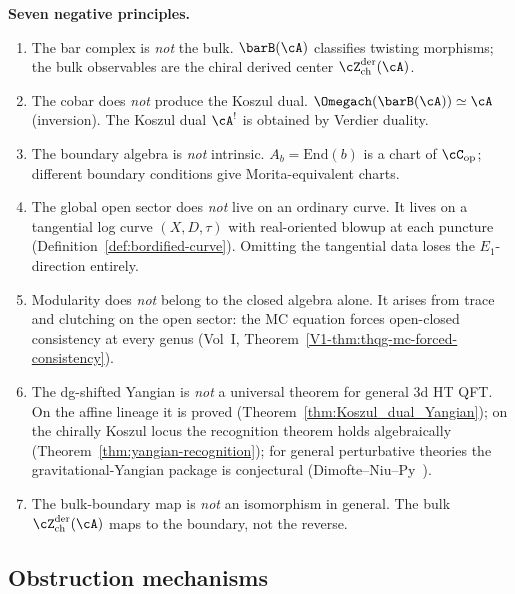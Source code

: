 \medskip
\noindent\textbf{Seven negative principles.}
\begin{enumerate}[label=\textup{(N\arabic*)}]
\item The bar complex is \emph{not} the bulk.
 $\barB(\cA)$ classifies twisting morphisms; the bulk observables
 are the chiral derived center $\cZ^{\mathrm{der}}_{\mathrm{ch}}(\cA)$.
\item The cobar does \emph{not} produce the Koszul dual.
 $\Omegach(\barB(\cA)) \simeq \cA$ (inversion).
 The Koszul dual $\cA^!$ is obtained by Verdier duality.
\item The boundary algebra is \emph{not} intrinsic.
 $A_b = \mathrm{End}(b)$ is a chart of
 $\cC_{\mathrm{op}}$; different boundary conditions give
 Morita-equivalent charts.
\item The global open sector does \emph{not} live on an ordinary
 curve. It lives on a tangential log curve $(X,D,\tau)$ with
 real-oriented blowup at each puncture
 (Definition~\ref{def:bordified-curve}). Omitting the tangential
 data loses the $E_1$-direction entirely.
\item Modularity does \emph{not} belong to the closed algebra alone.
 It arises from trace and clutching on the open sector:
 the MC equation forces open-closed consistency at every genus
 (Vol~I, Theorem~\ref*{V1-thm:thqg-mc-forced-consistency}).
\item The dg-shifted Yangian is \emph{not} a universal theorem for
 general 3d HT QFT. On the affine lineage it is proved
 (Theorem~\ref{thm:Koszul_dual_Yangian}); on the chirally Koszul
 locus the recognition theorem holds algebraically
 (Theorem~\ref{thm:yangian-recognition}); for general perturbative
 theories the gravitational-Yangian package is conjectural
 (Dimofte--Niu--Py~\cite{DNP25}).
\item The bulk-boundary map is \emph{not} an isomorphism in general.
 The bulk $\cZ^{\mathrm{der}}_{\mathrm{ch}}(\cA)$ maps to the
 boundary, not the reverse.
\end{enumerate}

\subsection{Obstruction mechanisms}
\label{sec:research-signals}

